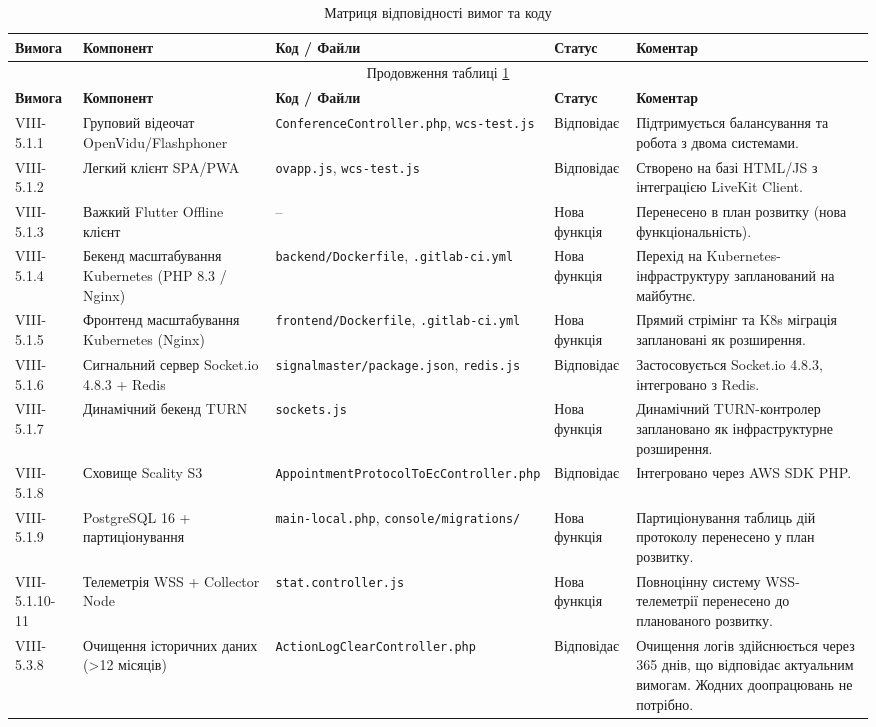 \documentclass{article}
\begin{document}
\begin{longtable}{p{2.5cm}p{3cm}p{4cm}p{1.5cm}p{4cm}}
\caption{Матриця відповідності вимог та коду} \label{tab:compliance} \\
\toprule
\textbf{Вимога} & \textbf{Компонент} & \textbf{Код / Файли} & \textbf{Статус} & \textbf{Коментар} \\
\midrule
\endfirsthead
\multicolumn{5}{c}{Продовження таблиці \ref{tab:compliance}} \\
\toprule
\textbf{Вимога} & \textbf{Компонент} & \textbf{Код / Файли} & \textbf{Статус} & \textbf{Коментар} \\
\midrule
\endhead
\bottomrule
\endfoot
\bottomrule
\endlastfoot
         VIII-5.1.1 & Груповий відеочат OpenVidu/Flashphoner & \texttt{ConferenceController.php}, \texttt{wcs-test.js} & Відповідає & Підтримується балансування та робота з двома системами. \\
\midrule VIII-5.1.2 & Легкий клієнт SPA/PWA & \texttt{ovapp.js}, \texttt{wcs-test.js} & Відповідає & Створено на базі HTML/JS з інтеграцією LiveKit Client. \\
\midrule VIII-5.1.3 & Важкий Flutter Offline клієнт & -- & Нова функція & Перенесено в план розвитку (нова функціональність). \\
\midrule VIII-5.1.4 & Бекенд масштабування Kubernetes (PHP 8.3 / Nginx) & \texttt{backend/Dockerfile}, \texttt{.gitlab-ci.yml} & Нова функція & Перехід на Kubernetes-інфраструктуру запланований на майбутнє. \\
\midrule VIII-5.1.5 & Фронтенд масштабування Kubernetes (Nginx) & \texttt{frontend/Dockerfile}, \texttt{.gitlab-ci.yml} & Нова функція & Прямий стрімінг та K8s міграція заплановані як розширення. \\
\midrule VIII-5.1.6 & Сигнальний сервер Socket.io 4.8.3 + Redis & \texttt{signalmaster/package.json}, \texttt{redis.js} & Відповідає & Застосовується Socket.io 4.8.3, інтегровано з Redis. \\
\midrule VIII-5.1.7 & Динамічний бекенд TURN & \texttt{sockets.js} & Нова функція & Динамічний TURN-контролер заплановано як інфраструктурне розширення. \\
\midrule VIII-5.1.8 & Сховище Scality S3 & \texttt{AppointmentProtocolToEcController.php} & Відповідає & Інтегровано через AWS SDK PHP. \\
\midrule VIII-5.1.9 & PostgreSQL 16 + партиціонування & \texttt{main-local.php}, \texttt{console/migrations/} & Нова функція & Партиціонування таблиць дій протоколу перенесено у план розвитку. \\
\midrule VIII-5.1.10-11 & Телеметрія WSS + Collector Node & \texttt{stat.controller.js} & Нова функція & Повноцінну систему WSS-телеметрії перенесено до планованого розвитку. \\
\midrule VIII-5.3.8 & Очищення історичних даних (>12 місяців) & \texttt{ActionLogClearController.php} & Відповідає & Очищення логів здійснюється через 365 днів, що відповідає актуальним вимогам. Жодних доопрацювань не потрібно. \\
\end{longtable}
\end{document}
